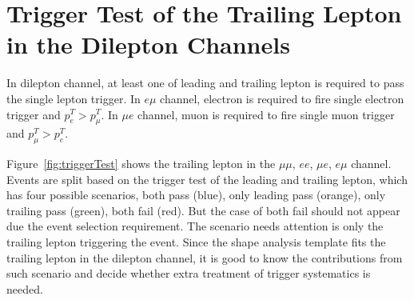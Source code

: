 \section{Trigger Test of the Trailing Lepton in the Dilepton Channels}
\label{sec:app:triggerTest}

In dilepton channel, at least one of leading and trailing lepton is 
required to pass the single lepton trigger.
In $e\mu$ channel, electron is required to fire single electron trigger and $p^T_e>p^T_\mu$.
In $\mu e$ channel, muon is required to fire single muon trigger and $p^T_\mu>p^T_e$.


Figure~\ref{fig:triggerTest} shows the trailing lepton \pt in the $\mu\mu$, $ee$, $\mu e$, $e\mu$ channel.
Events are split based on the trigger test of the leading and trailing lepton, which has four possible
scenarios, both pass (blue), only leading pass (orange), only trailing pass (green), both fail (red).
But the case of both fail should not appear due the event selection requirement. The scenario needs
attention is only the trailing lepton triggering the event. Since the shape analysis template fits the
trailing lepton \pt in the dilepton channel, it is good to know the contributions from such scenario and
decide whether extra treatment of trigger systematics is needed.


